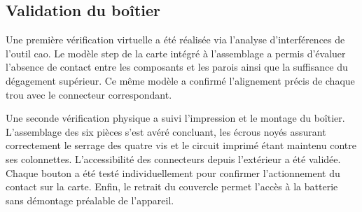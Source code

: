\subsection{Validation du boîtier}

Une première vérification virtuelle a été réalisée via l'analyse d'interférences de l'outil \gls{cao}. Le modèle \gls{step} de la carte intégré à l'assemblage a permis d'évaluer l'absence de contact entre les composants et les parois ainsi que la suffisance du dégagement supérieur. Ce même modèle a confirmé l'alignement précis de chaque trou avec le connecteur correspondant.

Une seconde vérification physique a suivi l'impression et le montage du boîtier. L'assemblage des six pièces s'est avéré concluant, les écrous noyés assurant correctement le serrage des quatre vis et le circuit imprimé étant maintenu contre ses colonnettes. L'accessibilité des connecteurs depuis l'extérieur a été validée. Chaque bouton a été testé individuellement pour confirmer l'actionnement du contact sur la carte. Enfin, le retrait du couvercle permet l'accès à la batterie sans démontage préalable de l'appareil.